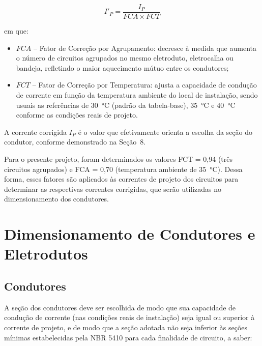 \documentclass[12pt,openright,oneside,a4paper,brazil]{abntex2}
\begin{document}
\begin{equation}
    I'_{P} = \dfrac{I_P}{FCA \times FCT}
    \label{eq:corrente_corrigida}
\end{equation}

em que:

\begin{itemize}[leftmargin=1.2cm]
    \item $FCA$ -- {Fator de Correção por Agrupamento}: decresce à
    medida que aumenta o número de circuitos agrupados no mesmo eletroduto,
    eletrocalha ou bandeja, refletindo o maior aquecimento mútuo entre os
    condutores;
    \item $FCT$ -- {Fator de Correção por Temperatura}: ajusta a
    capacidade de condução de corrente em função da temperatura ambiente do
    local de instalação, sendo usuais as referências de \SI{30}{\celsius}
    (padrão da tabela-base), \SI{35}{\celsius} e \SI{40}{\celsius} conforme
    as condições reais de projeto.
\end{itemize}

A corrente corrigida $I_{P}$ é o valor que efetivamente orienta a escolha
da seção do condutor, conforme demonstrado na Seção~8.

Para o presente projeto, foram determinados os valores FCT = 0,94 (três circuitos agrupados) e FCA = 0,70 (temperatura ambiente de \SI{35}{\celsius}). Dessa forma, esses fatores são aplicados às correntes de projeto dos circuitos para determinar as respectivas correntes corrigidas, que serão utilizadas no dimensionamento dos condutores.
\section{Dimensionamento de Condutores e Eletrodutos}

\hspace{1.27cm}\subsection{Condutores}

\hspace{1.27cm} A seção dos condutores deve ser escolhida de modo que sua capacidade de
condução de corrente (nas condições reais de instalação) seja igual ou
superior à corrente de projeto, e de modo que a seção adotada não seja
inferior às seções mínimas estabelecidas pela NBR 5410 para cada finalidade
de circuito, a saber:
\end{document}
